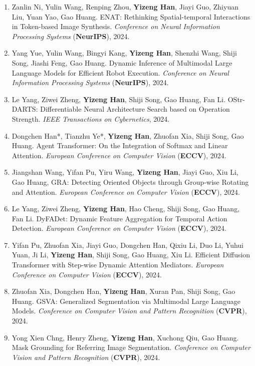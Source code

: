\documentclass[10.5pt]{article}
\makeatletter
\newlength{\bibhang}
\newlength{\bibsep}
 {\@listi \global\bibsep\itemsep \global\advance\bibsep by\parsep}
\newenvironment{bibsection}%
        {\begin{enumerate}{%
       \setlength{\leftmargin}{-2em}%
       \setlength{\itemindent}{-2em}%
       \setlength{\itemsep}{\bibsep}%
        \setlength{\partopsep}{0pt}%
        \setlength{\topsep}{0pt}}}
        {\end{enumerate}\vspace{-.6\baselineskip}}
\makeatother
\begin{document}
\begin{sloppypar}
\begin{bibsection}
        \item Zanlin Ni, Yulin Wang, Renping Zhou, \textbf{Yizeng Han}, Jiayi Guo, Zhiyuan Liu, Yuan Yao, Gao Huang. ENAT: Rethinking Spatial-temporal Interactions in Token-based Image Synthesis. \emph{Conference on Neural Information Processing Systems} (\textbf{NeurIPS}), 2024.
        \item Yang Yue, Yulin Wang, Bingyi Kang, \textbf{Yizeng Han}, Shenzhi Wang, Shiji Song, Jiashi Feng, Gao Huang. Dynamic Inference of Multimodal Large Language Models for Efficient Robot Execution.  \emph{Conference on Neural Information Processing Systems} (\textbf{NeurIPS}), 2024.
        \item Le Yang, Ziwei Zheng, \textbf{Yizeng Han}, Shiji Song, Gao Huang, Fan Li. OStr-DARTS: Differentiable Neural Architecture Search based on Operation Strength. \emph{IEEE Transactions on Cybernetics}, 2024.
        \item Dongchen Han*, Tianzhu Ye*, \textbf{Yizeng Han}, Zhuofan Xia, Shiji Song, Gao Huang. Agent Transformer: On the Integration of Softmax and Linear Attention. \emph{European Conference on Computer Vision} (\textbf{ECCV}), 2024.
        \item Jiangshan Wang, Yifan Pu, Yiru Wang, \textbf{Yizeng Han}, Jiayi Guo, Xiu Li, Gao Huang, GRA: Detecting Oriented Objects through Group-wise Rotating and Attention. \emph{European Conference on Computer Vision} (\textbf{ECCV}), 2024.
        \item Le Yang, Ziwei Zheng, \textbf{Yizeng Han}, Hao Cheng, Shiji Song, Gao Huang, Fan Li. DyFADet: Dynamic Feature Aggregation for Temporal Action Detection. \emph{European Conference on Computer Vision} (\textbf{ECCV}), 2024.
        \item Yifan Pu, Zhuofan Xia, Jiayi Guo, Dongchen Han, Qixiu Li, Duo Li, Yuhui Yuan, Ji Li, \textbf{Yizeng Han}, Shiji Song, Gao Huang, Xiu Li. Efficient Diffusion Transformer with Step-wise Dynamic Attention Mediators. \emph{European Conference on Computer Vision} (\textbf{ECCV}), 2024.
        \item Zhuofan Xia, Dongchen Han, \textbf{Yizeng Han}, Xuran Pan, Shiji Song, Gao Huang. GSVA: Generalized Segmentation via Multimodal Large Language Models. \emph{Conference on Computer Vision and Pattern Recognition} (\textbf{CVPR}), 2024.
        \item Yong Xien Chng, Henry Zheng, \textbf{Yizeng Han}, Xuchong Qiu, Gao Huang. Mask Grounding for Referring Image Segmentation. \emph{Conference on Computer Vision and Pattern Recognition} (\textbf{CVPR}), 2024.

\end{bibsection}
\end{sloppypar}
\end{document}
